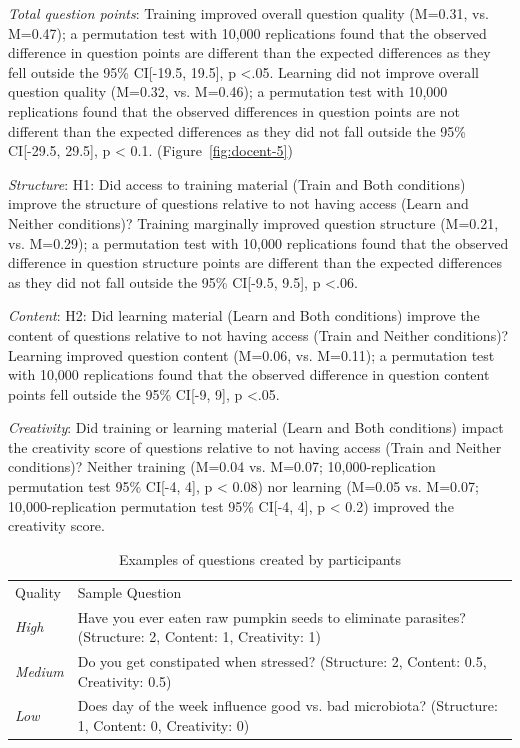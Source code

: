 \textit{Total question points}: Training improved overall question quality (M=0.31, vs. M=0.47); a permutation test with 10,000 replications found that the observed difference in question points are different than the expected differences as they fell outside the 95\% CI[-19.5, 19.5], p <.05. Learning did not improve overall question quality (M=0.32, vs. M=0.46); a permutation test with 10,000 replications found that the observed differences in question points are not different than the expected differences as they did not fall outside the 95\% CI[-29.5, 29.5], p < 0.1. (Figure~\ref{fig:docent-5})

\textit{Structure}: H1: Did access to training material (Train and Both conditions) improve the structure of questions relative to not having access (Learn and Neither conditions)? Training marginally improved question structure (M=0.21, vs. M=0.29); a permutation test with 10,000 replications found that the observed difference in question structure points are different than the expected differences as they did not fall outside the 95\% CI[-9.5, 9.5], p <.06.

\textit{Content}: H2: Did learning material (Learn and Both conditions) improve the content of questions relative to not having access (Train and Neither conditions)? Learning improved question content (M=0.06, vs. M=0.11); a permutation test with 10,000 replications found that the observed difference in question content points fell outside the 95\% CI[-9, 9], p <.05.

\textit{Creativity}: Did training or learning material (Learn and Both conditions) impact the creativity score of questions relative to not having access (Train and Neither conditions)? Neither training (M=0.04 vs. M=0.07; 10,000-replication permutation test 95\% CI[-4, 4], p < 0.08) nor learning (M=0.05 vs. M=0.07; 10,000-replication permutation test 95\% CI[-4, 4], p < 0.2) improved the creativity score.

\vspace{0.25in}
\begin{table}[!ht]
\caption[Examples of questions created by participants]
{Examples of questions created by participants}

\vspace{-0.25in}
\begin{center}
\renewcommand{\arraystretch}{1.5}
\begin{tabular}{p{1in}p{4.5in}}
\hline
Quality & Sample Question \\
\textit{High} 		& Have you ever eaten raw pumpkin seeds to eliminate parasites? (Structure: 2, Content: 1, Creativity: 1) \\

\textit{Medium} 	& Do you get constipated when stressed? (Structure: 2, Content: 0.5, Creativity: 0.5) \\

\textit{Low} 		& Does day of the week influence good vs. bad microbiota? (Structure: 1, Content: 0, Creativity: 0) \\
\hline
\end{tabular}
\end{center}
\label{d-tab:results2}
\end{table}

